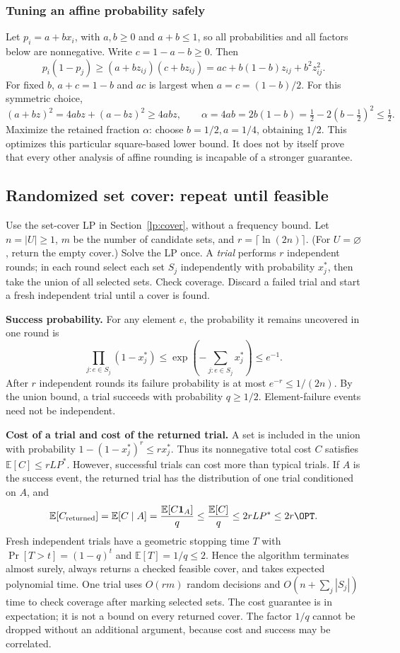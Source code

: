 \subsubsection*{Tuning an affine probability safely}
Let $p_i=a+bx_i$, with $a,b\ge0$ and $a+b\le1$, so all probabilities and
all factors below are nonnegative. Write $c=1-a-b\ge0$. Then
\[
  p_i(1-p_j)\ge(a+bz_{ij})(c+bz_{ij})
    =ac+b(1-b)z_{ij}+b^2z_{ij}^2.
\]
For fixed $b$, $a+c=1-b$ and $ac$ is largest when
$a=c=(1-b)/2$. For this symmetric choice,
\[
  (a+bz)^2=4abz+(a-bz)^2\ge4abz,
  \qquad
  \alpha=4ab=2b(1-b)=\tfrac12-2(b-\tfrac12)^2\le\tfrac12.
\]
Maximize the retained fraction $\alpha$: choose $b=1/2,a=1/4$, obtaining
$1/2$. This optimizes this particular square-based lower bound. It does
not by itself prove that every other analysis of affine rounding is
incapable of a stronger guarantee.

\subsection{Randomized set cover: repeat until feasible}\label{lp:random-cover}
Use the set-cover LP in Section~\ref{lp:cover}, without a frequency bound.
Let $n=|U|\ge1$, $m$ be the number of candidate sets, and
$r=\lceil\ln(2n)\rceil$. (For $U=\varnothing$, return the empty cover.)
Solve the LP once. A \emph{trial} performs $r$ independent rounds; in each
round select each set $S_j$ independently with probability $x_j^*$, then
take the union of all selected sets. Check coverage. Discard a failed trial
and start a fresh independent trial until a cover is found.

\textbf{Success probability.}
For any element $e$, the probability it remains uncovered in one round is
\[
  \prod_{j:e\in S_j}(1-x_j^*)
    \le\exp\left(-\sum_{j:e\in S_j}x_j^*\right)\le e^{-1}.
\]
After $r$ independent rounds its failure probability is at most
$e^{-r}\le1/(2n)$. By the union bound, a trial succeeds with probability
$q\ge1/2$. Element-failure events need not be independent.

\textbf{Cost of a trial and cost of the returned trial.}
A set is included in the union with probability
$1-(1-x_j^*)^r\le r x_j^*$. Thus its nonnegative total cost $C$ satisfies
$\mathbb E[C]\le rLP^*$. However, successful trials can cost more than
typical trials. If $A$ is the success event, the returned trial has the
distribution of one trial conditioned on $A$, and
\[
  \mathbb E[C_{\rm returned}]
    =\mathbb E[C\mid A]
    =\frac{\mathbb E[C\mathbf 1_A]}q
    \le\frac{\mathbb E[C]}q
    \le2rLP^*\le2r\OPT.
\]
Fresh independent trials have a geometric stopping time $T$ with
$\Pr[T>t]=(1-q)^t$ and $\mathbb E[T]=1/q\le2$. Hence the algorithm
terminates almost surely, always returns a checked feasible cover, and
takes expected polynomial time. One trial uses $O(rm)$ random decisions
and $O(n+\sum_j|S_j|)$ time to check coverage after marking selected sets.
The cost guarantee is in expectation; it is not a bound on every returned
cover. The factor $1/q$ cannot be dropped without an additional argument,
because cost and success may be correlated.
